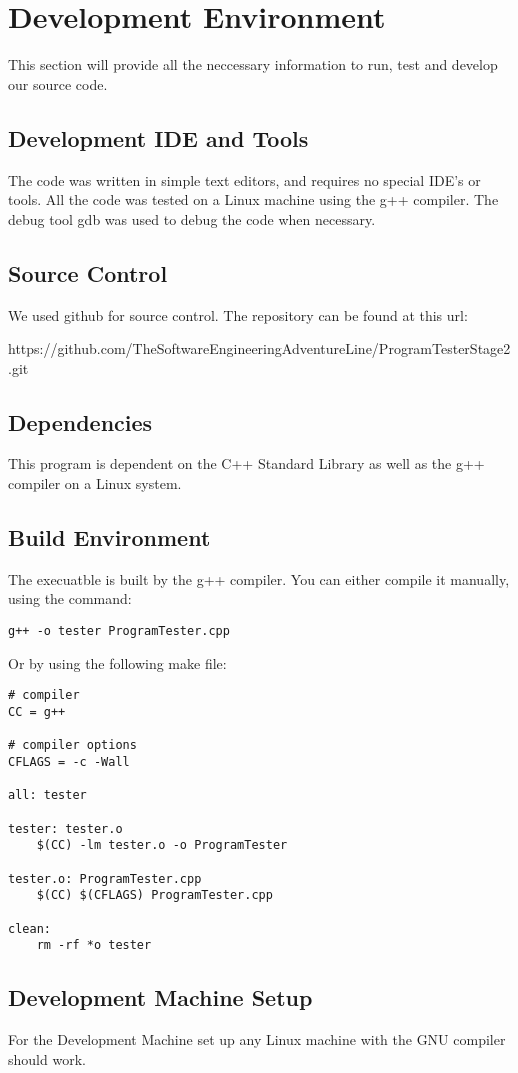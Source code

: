 \chapter{Development Environment}
This section will provide all the neccessary information to run, test and develop 
our source code.


\section{Development IDE and Tools}
The code was written in simple text editors, and requires no special IDE's or tools.  All
the code was tested on a Linux machine using the g++ compiler.  The debug tool
gdb was used to debug the code when necessary.

\section{Source  Control}
We used github for source control.  The repository can be found at this url: 

https://github.com/TheSoftwareEngineeringAdventureLine/ProgramTesterStage2.git

\section{Dependencies}
This program is dependent on the C++ Standard Library as well as the g++ compiler
on a Linux system.

\section{Build  Environment}
The execuatble is built by the g++ compiler.  You can either compile it manually, using the command:
\begin{lstlisting}
g++ -o tester ProgramTester.cpp
\end{lstlisting}
Or by using the following make file:

\begin{lstlisting}
# compiler
CC = g++

# compiler options
CFLAGS = -c -Wall

all: tester

tester: tester.o
	$(CC) -lm tester.o -o ProgramTester

tester.o: ProgramTester.cpp
	$(CC) $(CFLAGS) ProgramTester.cpp

clean:
	rm -rf *o tester
\end{lstlisting}

\section{Development Machine Setup}
For the Development Machine set up any Linux machine with the GNU compiler should work.

